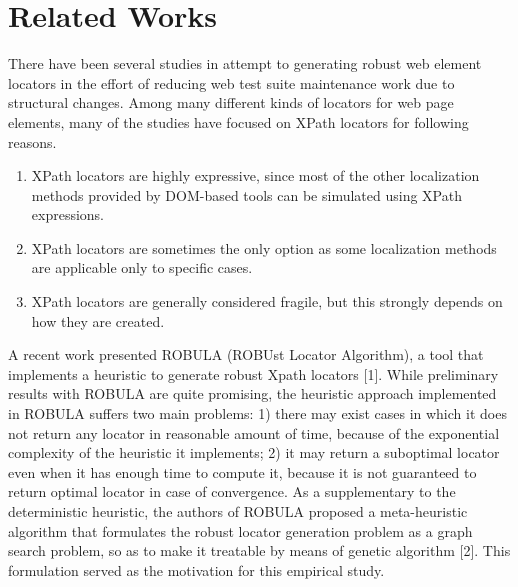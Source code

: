 \documentclass[format=acmlarge, nonacm=true]{acmart}
\begin{document}
\section{Related Works}
There have been several studies in attempt to generating robust web element locators in the effort of reducing web test suite maintenance work due to structural changes. Among many different kinds of locators for web page elements, many of the studies have focused on XPath locators for following reasons.
\begin{enumerate}
	\item XPath locators are highly expressive, since most of the other localization methods provided by DOM-based tools can be simulated using XPath expressions.
	\item XPath locators are sometimes the only option as some localization methods are applicable only to specific cases.
	\item XPath locators are generally considered fragile, but this strongly depends on how they are created.	
\end{enumerate}
A recent work presented ROBULA (ROBUst Locator Algorithm), a tool that implements a heuristic to generate robust Xpath locators [1]. While preliminary results with ROBULA are quite promising, the heuristic approach implemented in ROBULA suffers two main problems: 1) there may exist cases in which it does not return any locator in reasonable amount of time, because of the exponential complexity of the heuristic it implements; 2) it may return a suboptimal locator even when it has enough time to compute it, because it is not guaranteed to return optimal locator in case of convergence. As a supplementary to the deterministic heuristic, the authors of ROBULA proposed a meta-heuristic algorithm that formulates the robust locator generation problem as a graph search problem, so as to make it treatable by means of genetic algorithm [2]. This formulation served as the motivation for this empirical study.
\end{document}
